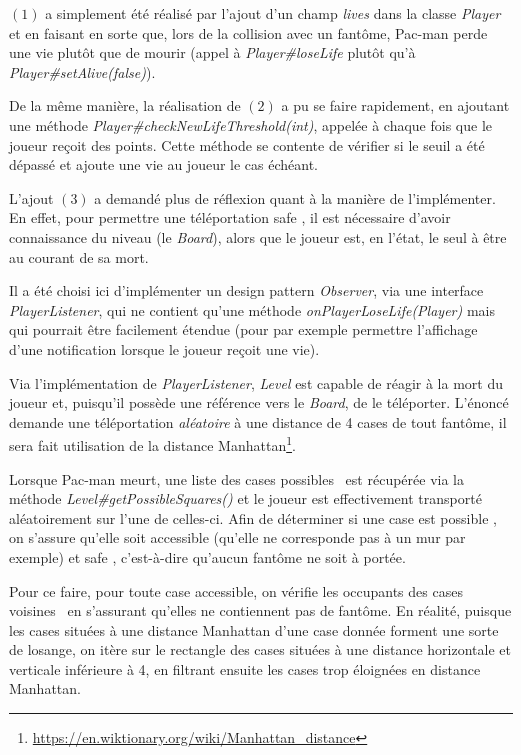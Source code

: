 \documentclass[12pt, openany]{report}
\begin{document}
$(1)$ a simplement été réalisé par l'ajout d'un champ \mbox{\textit{lives}} dans la classe \mbox{\textit{Player}} et en faisant en sorte que, lors de la collision avec un fantôme, Pac-man perde une vie plutôt que de mourir (appel à \mbox{\textit{Player\#loseLife}} plutôt qu'à \mbox{\textit{Player\#setAlive(false)}}).

De la même manière, la réalisation de $(2)$ a pu se faire rapidement, en ajoutant une méthode \mbox{\textit{Player\#checkNewLifeThreshold(int)}}, appelée à chaque fois que le joueur reçoit des points. Cette méthode se contente de vérifier si le seuil a été dépassé et ajoute une vie au joueur le cas échéant.

L'ajout $(3)$ a demandé plus de réflexion quant à la manière de l'implémenter. En effet, pour permettre une téléportation \og safe \fg , il est nécessaire d'avoir connaissance du niveau (le \mbox{\textit{Board}}), alors que le joueur est, en l'état, le seul à être au courant de sa mort.

Il a été choisi ici d'implémenter un design pattern \mbox{\textit{Observer}}, via une interface \mbox{\textit{PlayerListener}}, qui ne contient qu'une méthode \mbox{\textit{onPlayerLoseLife(Player)}} mais qui pourrait être facilement étendue (pour par exemple permettre l'affichage d'une notification lorsque le joueur reçoit une vie).

Via l'implémentation de \mbox{\textit{PlayerListener}}, \mbox{\textit{Level}} est capable de réagir à la mort du joueur et, puisqu'il possède une référence vers le \mbox{\textit{Board}}, de le téléporter. L'énoncé demande une téléportation \textit{aléatoire} à une distance de 4 cases de tout fantôme, il sera fait utilisation de la distance Manhattan\footnote{\url{https://en.wiktionary.org/wiki/Manhattan_distance}}.

Lorsque Pac-man meurt, une liste des cases \og possibles \fg \, est récupérée via la méthode \mbox{\textit{Level\#getPossibleSquares()}} et le joueur est effectivement transporté aléatoirement sur l'une de celles-ci. Afin de déterminer si une case est \og possible \fg , on s'assure qu'elle soit accessible (qu'elle ne corresponde pas à un mur par exemple) et \og safe \fg , c'est-à-dire qu'aucun fantôme ne soit à portée.

Pour ce faire, pour toute case accessible, on vérifie les occupants des cases \og voisines \fg \, en s'assurant qu'elles ne contiennent pas de fantôme. En réalité, puisque les cases situées à une distance Manhattan d'une case donnée forment une sorte de losange, on itère sur le rectangle des cases situées à une distance horizontale et verticale inférieure à 4, en filtrant ensuite les cases trop éloignées en distance Manhattan. 
\end{document}
